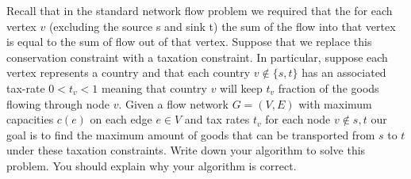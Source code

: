 \begin{exercise}[]{Recall that in the standard network flow problem we required that the for each vertex $v$ (excluding the source s and sink t) the sum of the flow into that vertex is equal to the sum of flow out of that vertex. Suppose that we replace this conservation constraint with a taxation constraint. In particular, suppose each vertex represents a country and that each country $v \notin  \{s, t\}$ has an associated tax-rate $0 < t_v < 1$ meaning that country $v$ will keep
    $t_v$ fraction of the goods flowing through node $v$. Given a flow network $G = (V, E)$ with maximum capacities $c(e)$ on each edge $e \in V$ and tax rates $t_v$ for each node $v \notin {s, t}$ our goal is to find the maximum amount of goods that can be transported from $s$ to $t$ under these taxation constraints. Write down your algorithm to solve this problem. You should explain why your algorithm is correct. }
  \begin{solution}
  \par{~}





\end{solution}
\end{exercise}
